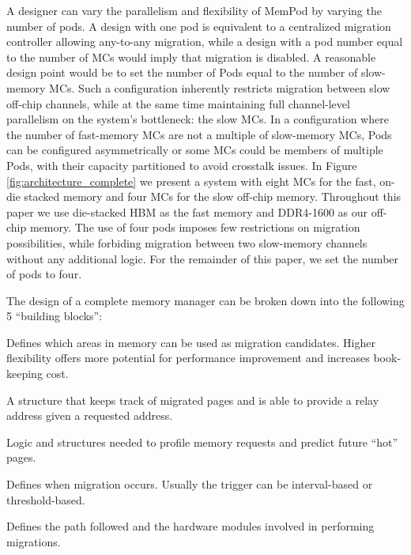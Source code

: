 A designer can vary the parallelism and flexibility of MemPod by varying the
number of pods. A design with one pod is equivalent to a centralized 
migration controller allowing any-to-any migration,
while a design with a pod number equal to the number of MCs would imply that migration is disabled. A reasonable design point would be to set the number of Pods equal to the number of slow-memory MCs. Such a configuration inherently restricts migration between slow off-chip channels, while at the same time maintaining full channel-level parallelism on the system's bottleneck: the slow MCs. In a configuration where the number of fast-memory MCs are not a multiple of slow-memory MCs, Pods can be configured asymmetrically or some MCs could be members of multiple Pods, with their capacity partitioned to avoid crosstalk issues. In Figure \ref{fig:architecture_complete} we present a system with eight MCs for the fast, on-die stacked memory and four MCs for the slow off-chip memory. Throughout this paper we use die-stacked HBM as the fast memory \cite{JEDEC-HBM-REVISED} and DDR4-1600 as our off-chip memory. The use of four pods imposes few restrictions on migration possibilities, while forbiding migration between two slow-memory channels without any additional logic. For the remainder of this paper, we set the number of pods to four.

The design of a complete memory manager can be broken down into the following 5 ``building blocks'':
\begin{description}[style=unboxed,leftmargin=0cm]
\setlength\itemsep{0em}
\item [Migration flexibility:] Defines which areas in memory can be used as migration candidates. Higher flexibility offers more potential for performance improvement and increases book-keeping cost.
\item [Remap table:] A structure that keeps track of migrated pages and is able to provide a relay address given a requested address.
\item [Activity tracking:] Logic and structures needed to profile memory requests and predict future ``hot'' pages.
\item [Migration trigger:] Defines when migration occurs. Usually the trigger can be interval-based or threshold-based.
\item [Migration driver/datapath:] Defines the path followed and the hardware modules involved in performing migrations.
\end{description}

